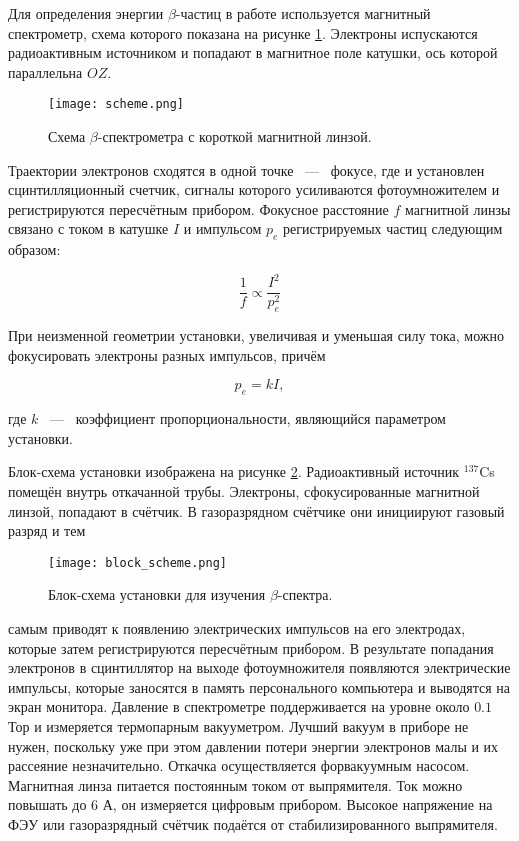 Для определения энергии $\beta$-частиц в работе используется магнитный
спектрометр, схема которого показана на рисунке \ref{img::scheme}.
Электроны испускаются радиоактивным источником и попадают в магнитное поле
катушки, ось которой параллельна $OZ$.
\begin{figure}[h]
  \centering
  \texttt{[image: scheme.png]}
  \caption{Схема $\beta$-спектрометра с короткой магнитной линзой.}
  \label{img::scheme}
\end{figure}
Траектории электронов сходятся в одной точке ~---~ фокусе, где и установлен
сцинтилляционный счетчик, сигналы которого усиливаются фотоумножителем и
регистрируются пересчётным прибором. Фокусное расстояние $f$ магнитной линзы
связано с током в катушке $I$ и импульсом $p_e$ регистрируемых частиц следующим
образом:

\[ \frac{1}{f} \propto \frac{I^2}{p_e^2} \]

При неизменной геометрии установки, увеличивая и уменьшая силу тока, можно
фокусировать электроны разных импульсов, причём

\begin{equation}\label{eq::pek}
p_e = kI,
\end{equation}

где $k$ ~---~ коэффициент пропорциональности, являющийся параметром установки.

Блок-схема установки изображена на рисунке \ref{img::block_scheme}.
Радиоактивный источник $^{137}$Cs помещён внутрь откачанной трубы.
Электроны, сфокусированные магнитной линзой, попадают в счётчик.
В газоразрядном счётчике они инициируют газовый разряд и тем
\begin{figure}[h]
  \centering
  \texttt{[image: block\_scheme.png]}
  \caption{Блок-схема установки для изучения $\beta$-спектра.}
  \label{img::block_scheme}
\end{figure}
самым приводят к появлению электрических импульсов на его электродах, которые
затем регистрируются пересчётным прибором. В результате попадания электронов в
сцинтиллятор на выходе фотоумножителя появляются электрические импульсы, которые
заносятся в память персонального компьютера и выводятся на экран монитора.
Давление в спектрометре поддерживается на уровне около $0.1$ Тор и измеряется
термопарным вакууметром. Лучший вакуум в приборе не нужен, поскольку уже при
этом давлении потери энергии электронов малы и их рассеяние незначительно.
Откачка осуществляется форвакуумным насосом. Магнитная линза питается постоянным
током от выпрямителя. Ток можно повышать до $6$ А, он измеряется цифровым
прибором. Высокое напряжение на ФЭУ или газоразрядный счётчик подаётся от
стабилизированного выпрямителя.